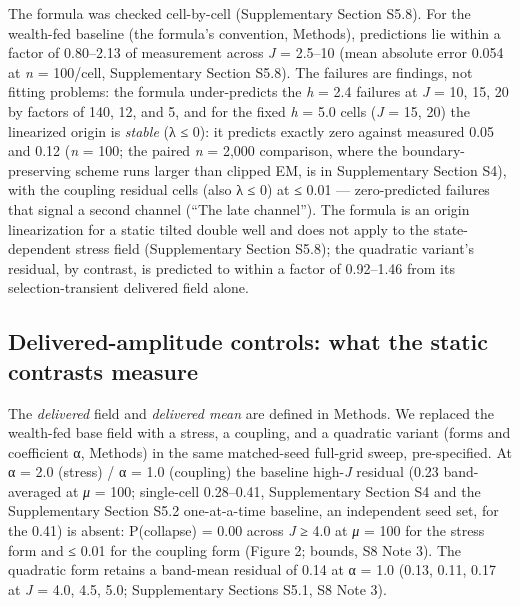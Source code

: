 \documentclass[11pt,letterpaper]{article}
\begin{document}
The formula was checked cell-by-cell (Supplementary Section S5.8). For the wealth-fed baseline (the formula's convention, Methods), predictions lie within a factor of 0.80--2.13 of measurement across \emph{J} = 2.5--10 (mean absolute error 0.054 at \emph{n} = 100/cell, Supplementary Section S5.8). The failures are findings, not fitting problems: the formula under-predicts the \emph{h} = 2.4 failures at \emph{J} = 10, 15, 20 by factors of 140, 12, and 5, and for the fixed \emph{h} = 5.0 cells (\emph{J} = 15, 20) the linearized origin is \emph{stable} (λ ≤ 0): it predicts exactly zero against measured 0.05 and 0.12 (\emph{n} = 100; the paired \emph{n} = 2,000 comparison, where the boundary-preserving scheme runs larger than clipped EM, is in Supplementary Section S4), with the coupling residual cells (also λ ≤ 0) at ≤ 0.01 --- zero-predicted failures that signal a second channel (``The late channel''). The formula is an origin linearization for a static tilted double well and does not apply to the state-dependent stress field (Supplementary Section S5.8); the quadratic variant's residual, by contrast, is predicted to within a factor of 0.92--1.46 from its selection-transient delivered field alone.

\subsection{Delivered-amplitude controls: what the static contrasts measure}\label{delivered-amplitude-controls-what-the-static-contrasts-measure}

The \emph{delivered} field and \emph{delivered mean} are defined in Methods. We replaced the wealth-fed base field with a stress, a coupling, and a quadratic variant (forms and coefficient α, Methods) in the same matched-seed full-grid sweep, pre-specified. At α = 2.0 (stress) / α = 1.0 (coupling) the baseline high-\emph{J} residual (0.23 band-averaged at \emph{μ} = 100; single-cell 0.28--0.41, Supplementary Section S4 and the Supplementary Section S5.2 one-at-a-time baseline, an independent seed set, for the 0.41) is absent: P(collapse) = 0.00 across \emph{J} ≥ 4.0 at \emph{μ} = 100 for the stress form and ≤ 0.01 for the coupling form (Figure 2; bounds, S8 Note 3). The quadratic form retains a band-mean residual of 0.14 at α = 1.0 (0.13, 0.11, 0.17 at \emph{J} = 4.0, 4.5, 5.0; Supplementary Sections S5.1, S8 Note 3).
\end{document}
